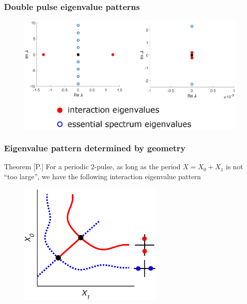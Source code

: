 \documentclass[16pt]{beamer}
\begin{document}
\begin{frame}
\frametitle{Double pulse eigenvalue patterns} 

    	\begin{figure}
		\begin{center}
		\includegraphics[width=12cm]{images/numericspec.eps}
		\end{center}
		\end{figure}
\end{frame}

\begin{frame}
\frametitle{Eigenvalue pattern determined by geometry} 
    \begin{block}{Theorem [P.]}
    For a periodic 2-pulse, as long as the period $X = X_0 + X_1$ is not ``too large'', we have the following interaction eigenvalue pattern
    	\begin{figure}
		\begin{center}
		\includegraphics[width=7cm]{images/2pitchforkcoloreig.eps}
		\end{center}
		\end{figure}
    \end{block}
\end{frame}
\end{document}

